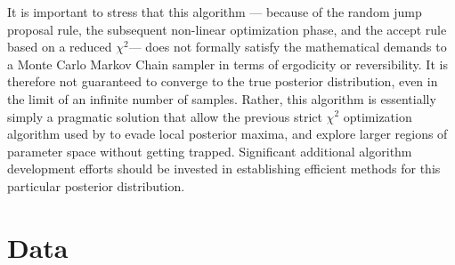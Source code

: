 \documentclass[twocolumn]{aa}
\begin{document}
It is important to stress that this algorithm --- because of the
random jump proposal rule, the subsequent non-linear optimization
phase, and the accept rule based on a reduced $\chi^2$--- does not
formally satisfy the mathematical demands to a Monte Carlo Markov
Chain sampler in terms of ergodicity or reversibility. It is therefore
not guaranteed to converge to the true posterior distribution, even in
the limit of an infinite number of samples. Rather, this algorithm is
essentially simply a pragmatic solution that allow the previous strict
$\chi^2$ optimization algorithm used by \citet{Kelsall1998} to evade
local posterior maxima, and explore larger regions of parameter space
without getting trapped. Significant additional algorithm development
efforts should be invested in establishing efficient methods for this
particular posterior distribution.


\section{Data}\label{sect:data}
\end{document}
